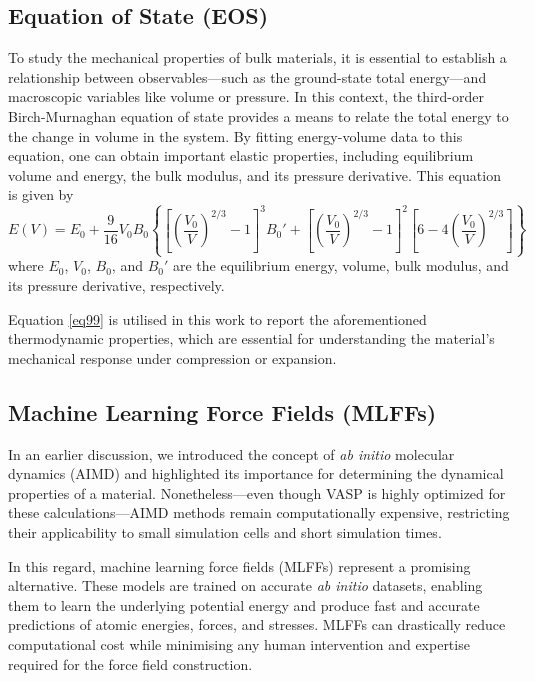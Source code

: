 \subsection{Equation of State (EOS)}
To study the mechanical properties of bulk materials, it is essential to establish a relationship between observables---such as the ground-state total energy---and macroscopic variables like volume or pressure. In this context, the third-order Birch-Murnaghan equation of state\supercite{Birch1947,poirier2000introduction} provides a means to relate the total energy to the change in volume in the system. By fitting energy-volume data to this equation, one can obtain important elastic properties, including equilibrium volume and energy, the bulk modulus, and its pressure derivative. This equation is given by 
\begin{equation}
    \label{eq99}
     E(V) = E_0 + \frac{9}{16} V_0 B_0 \left\{ \left[ \left( \frac{V_0}{V} \right)^{2/3} 
     - 1 \right]^3 B_0' + \left[ \left( \frac{V_0}{V} \right)^{2/3} - 1 \right]^2 \left[6 - 4 \left( \frac{V_0}{V} \right)^{2/3} \right] \right\}
\end{equation}
where $E_0$, $V_0$, $B_0$, and $B_0'$ are the equilibrium energy, volume, bulk modulus, and its pressure derivative, respectively.

Equation \ref{eq99} is utilised in this work to report the aforementioned thermodynamic properties, which are essential for understanding the material's mechanical response under compression or expansion. 

\subsection{Machine Learning Force Fields (MLFFs)}
In an earlier discussion, we introduced the concept of \emph{ab initio} molecular dynamics (AIMD) and highlighted its importance for determining the dynamical properties of a material. Nonetheless---even though VASP is highly optimized for these calculations---AIMD methods remain computationally expensive, restricting their applicability to small simulation cells and short simulation times. 

In this regard, machine learning force fields (MLFFs) represent a promising alternative. These models are trained on accurate \emph{ab initio} datasets, enabling them to learn the underlying potential energy and produce fast and accurate predictions of atomic energies, forces, and stresses. MLFFs can drastically reduce computational cost while minimising any human intervention and expertise required for the force field construction.

